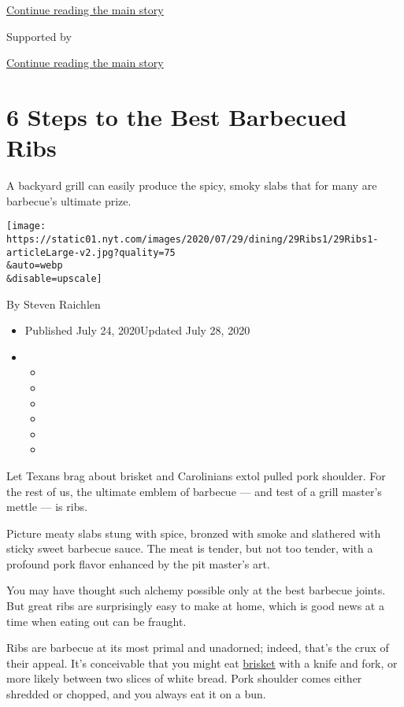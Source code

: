 \protect\hyperlink{after-top}{Continue reading the main story}

Supported by

\protect\hyperlink{after-sponsor}{Continue reading the main story}

\hypertarget{6-steps-to-the-best-barbecued-ribs}{%
\section{6 Steps to the Best Barbecued
Ribs}\label{6-steps-to-the-best-barbecued-ribs}}

A backyard grill can easily produce the spicy, smoky slabs that for many
are barbecue's ultimate prize.

\texttt{[image: https://static01.nyt.com/images/2020/07/29/dining/29Ribs1/29Ribs1-articleLarge-v2.jpg?quality=75\\\&auto=webp\\\&disable=upscale]}

By Steven Raichlen

\begin{itemize}
\item
  Published July 24, 2020Updated July 28, 2020
\item
  \begin{itemize}
  \item
  \item
  \item
  \item
  \item
  \item
  \end{itemize}
\end{itemize}

Let Texans brag about brisket and Carolinians extol pulled pork
shoulder. For the rest of us, the ultimate emblem of barbecue --- and
test of a grill master's mettle --- is ribs.

Picture meaty slabs stung with spice, bronzed with smoke and slathered
with sticky sweet barbecue sauce. The meat is tender, but not too
tender, with a profound pork flavor enhanced by the pit master's art.

You may have thought such alchemy possible only at the best barbecue
joints. But great ribs are surprisingly easy to make at home, which is
good news at a time when eating out can be fraught.

Ribs are barbecue at its most primal and unadorned; indeed, that's the
crux of their appeal. It's conceivable that you might eat
\href{https://www.nytimes.com/2019/05/24/dining/smoked-brisket.html}{brisket}
with a knife and fork, or more likely between two slices of white bread.
Pork shoulder comes either shredded or chopped, and you always eat it on
a bun.

